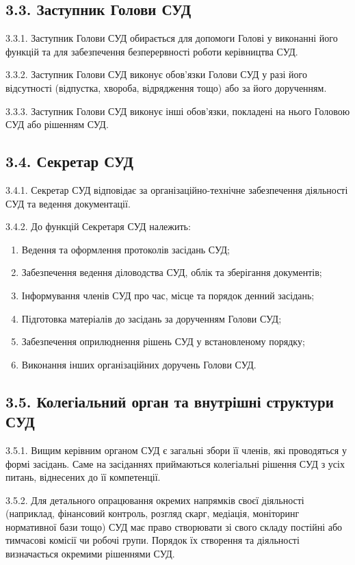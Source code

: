\subsection*{3.3. Заступник Голови СУД}
    3.3.1. Заступник Голови СУД обирається для допомоги Голові у виконанні його функцій та для забезпечення безперервності роботи керівництва СУД.

    3.3.2. Заступник Голови СУД виконує обов'язки Голови СУД у разі його відсутності (відпустка, хвороба, відрядження тощо) або за його дорученням.

    3.3.3. Заступник Голови СУД виконує інші обов'язки, покладені на нього Головою СУД або рішенням СУД.

\subsection*{3.4. Секретар СУД}
    3.4.1. Секретар СУД відповідає за організаційно-технічне забезпечення діяльності СУД та ведення документації.

    3.4.2. До функцій Секретаря СУД належить:
        \begin{enumerate}[label=\alph*)]
            \item Ведення та оформлення протоколів засідань СУД;
            \item Забезпечення ведення діловодства СУД, облік та зберігання документів;
            \item Інформування членів СУД про час, місце та порядок денний засідань;
            \item Підготовка матеріалів до засідань за дорученням Голови СУД;
            \item Забезпечення оприлюднення рішень СУД у встановленому порядку;
            \item Виконання інших організаційних доручень Голови СУД.
        \end{enumerate}

\subsection*{3.5. Колегіальний орган та внутрішні структури СУД}
    3.5.1. Вищим керівним органом СУД є загальні збори її членів, які проводяться у формі засідань. Саме на засіданнях приймаються колегіальні рішення СУД з усіх питань, віднесених до її компетенції.

    3.5.2. Для детального опрацювання окремих напрямків своєї діяльності (наприклад, фінансовий контроль, розгляд скарг, медіація, моніторинг нормативної бази тощо) СУД має право створювати зі свого складу постійні або тимчасові комісії чи робочі групи. Порядок їх створення та діяльності визначається окремими рішеннями СУД.